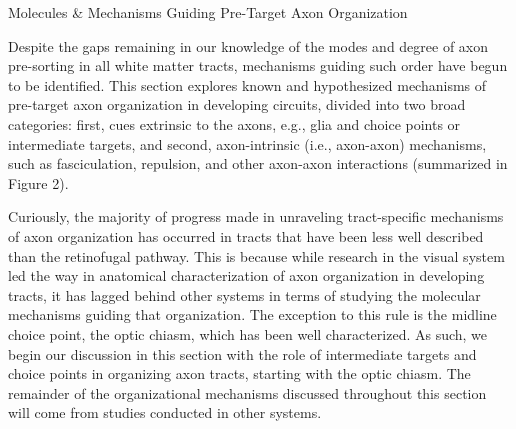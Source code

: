 Molecules \& Mechanisms Guiding Pre-Target Axon Organization

Despite the gaps remaining in our knowledge of the modes and degree of axon pre-sorting in all white matter tracts, mechanisms guiding such order have begun to be identified.
This section explores known and hypothesized mechanisms of pre-target axon organization in developing circuits, divided into two broad categories: first, cues extrinsic to the axons, e.g., glia and choice points or intermediate targets, and second, axon-intrinsic (i.e., axon-axon) mechanisms, such as fasciculation, repulsion, and other axon-axon interactions (summarized in Figure 2).

Curiously, the majority of progress made in unraveling tract-specific mechanisms of axon organization has occurred in tracts that have been less well described than the retinofugal pathway.
This is because while research in the visual system led the way in anatomical characterization of axon organization in developing tracts, it has lagged behind other systems in terms of studying the molecular mechanisms guiding that organization.
The exception to this rule is the midline choice point, the optic chiasm, which has been well characterized. As such, we begin our discussion in this section with the role of intermediate targets and choice points in organizing axon tracts, starting with the optic chiasm.
The remainder of the organizational mechanisms discussed throughout this section will come from studies conducted in other systems.

